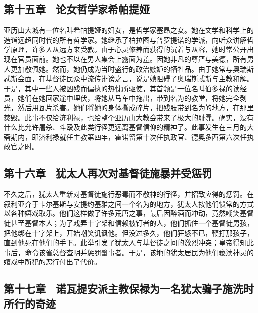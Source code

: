 
\subsection{第十五章　论女哲学家希帕提娅}

亚历山大城有一位名叫希帕提娅的妇女，是哲学家塞昂之女。她在文学和科学上的造诣远超同时代的所有哲学家。她继承了柏拉图与普罗提诺的学派，向听众讲解哲学原理，许多人从远方来受教。由于心灵修养而获得的沉着与从容，她时常公开出现在官员面前。她也不以在男人集会上露面为羞。因她非凡的尊严与美德，所有男人更加敬佩她。然而，她仍成为当时盛行的政治嫉妒的牺牲品。由于她常与奥瑞斯忒斯会面，在基督徒民众中流传诽谤之言，说是她阻碍了奥瑞斯忒斯与主教和解。于是，其中一些人被凶残而偏执的热忱所驱使，其首领是一位名叫伯多禄的读经员，她们在她回家途中埋伏，将她从马车中拖出，带到名为的教堂，将她完全剥光，然后用瓦片杀害。她们将她的身体撕成碎片，把残肢带到名为的地方，在那里焚毁。此事不仅给济利禄，也给整个亚历山大教会带来了极大的耻辱。确实，没有什么比允许屠杀、斗殴及此类行径更远离基督信仰的精神了。此事发生在三月的大斋期内，即济利禄就任主教第四年，霍诺留第十次任执政官、德奥多西第六次任执政官之时。\par


\subsection{第十六章　犹太人再次对基督徒施暴并受惩罚}

不久之后，犹太人重新对基督徒施行恶毒而不敬神的行径，并招致应得的惩罚。在叙利亚介于卡尔基斯与安提约基雅之间一个名为的地方，犹太人按他们惯常的方式以各种嬉戏取乐。他们这样做了许多荒唐之事，最后因醉酒而冲动，竟然嘲笑基督徒甚至基督本人；为了戏弄十字架和信赖被钉者的人，他们抓住一个基督徒男孩，把他绑在十字架上，开始嘲笑讥讽他。但没过多久，他们狂怒不已，鞭打那孩子，直到他死在他们的手下。此举引发了犹太人与基督徒之间的激烈冲突；皇帝得知此事后，命令该省总督查明并惩罚肇事者。于是，该地的犹太居民为他们亵渎神灵的嬉戏中所犯的恶行付出了代价。\par


\subsection{第十七章　诺瓦提安派主教保禄为一名犹太骗子施洗时所行的奇迹}

